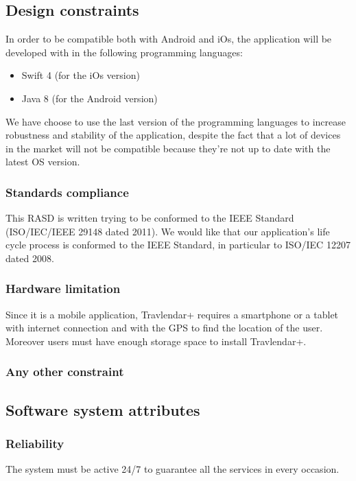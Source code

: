 \documentclass[12pt,titlepage]{article}
\begin{document}
\subsection{Design constraints}\label{sec:mod1}
In order to be compatible both with Android and iOs, the application will be developed with in the following programming languages:
\begin{itemize}
\item Swift 4 (for the iOs version)
\item Java 8 (for the Android version)
\end{itemize}
We have choose to use the last version of the programming languages to increase robustness and stability of the application, despite the fact that a lot of devices in the market will not be compatible because they're not up to date with the latest OS version.

\subsubsection{Standards compliance}\label{sec:mod1}
This RASD is written trying to be conformed to the IEEE Standard (ISO/IEC/IEEE 29148 dated 2011).
We would like that our application's life cycle process is conformed to the IEEE Standard, in particular to ISO/IEC 12207 dated 2008.

\subsubsection{Hardware limitation}\label{sec:mod1}
Since it is a mobile application, Travlendar+ requires a smartphone or a tablet with internet connection and with the GPS to find the location of the user.
Moreover users must have enough storage space to install Travlendar+. 

\subsubsection{Any other constraint}\label{sec:mod1}
\subsection{Software system attributes}\label{sec:mod1}
\subsubsection{Reliability}\label{sec:mod1}
The system must be active 24/7 to guarantee all the services in every occasion. 
\end{document}
